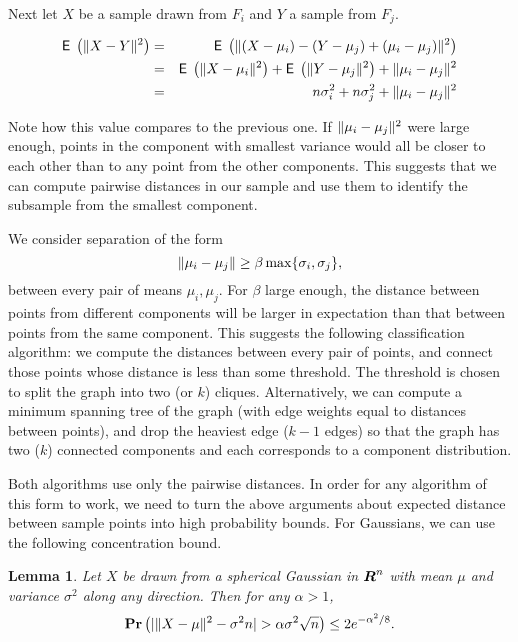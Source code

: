 \documentclass{book}
\newtheorem{lemma}[theorem]{Lemma}
\numberwithin{exercise}{chapter}
\begin{document}
Next let $X$ be a sample drawn from $F_i$ and $Y$ a sample from $F_j$.

\begin{eqnarray*}
\hbox{{\sf E}\;}\left(\|X-Y\|^2\right)  &=& \hbox{{\sf E}\;}\left(\|(X-\mu_i) - (Y-\mu_j) + (\mu_i-\mu_j)\|^2\right) \\
&=& \hbox{{\sf E}\;}\left(\|X-\mu_i\|^2\right) + \hbox{{\sf E}\;}\left(\|Y-\mu_j\|^2\right) + \|\mu_i-\mu_j\|^2 \\
&=&  n\sigma_i^2 + n\sigma_j^2 + \|\mu_i-\mu_j\|^2 \\
\end{eqnarray*}

Note how this value compares to the previous one.
If $\|\mu_i-\mu_j\|^2$ were large enough, points in the component with smallest variance would all be closer to each other than to any point from the other components. This suggests that we can compute pairwise distances in our sample and use them to identify the subsample from the smallest component.

We consider separation of the form
\begin{equation}\label{geom-sep}
\|\mu_i-\mu_j\| \ge \beta \max\{\sigma_i, \sigma_j\},
\end{equation}
between every pair of means $\mu_i, \mu_j$.
For $\beta$ large enough, the distance between points from different
components
will be larger in expectation than that between points from the same component.
This suggests the following classification algorithm: we
compute the distances between every pair of points, and
connect those points whose distance is less than some threshold.  The
threshold is chosen to split the graph into two (or $k$) cliques.
Alternatively, we can compute a minimum spanning tree of
the graph (with edge weights equal to distances between points), and
drop the heaviest edge ($k-1$ edges) so that the graph has two ($k$) connected components and each corresponds to a component distribution.

Both algorithms use only the pairwise distances.
In order for any algorithm of this form to work, we need to turn the
above arguments about expected distance between sample points into high probability
bounds. For Gaussians, we can use the following concentration bound.

\begin{lemma}\label{lem:spherical-conc}
Let $X$ be drawn from a spherical Gaussian in $\mbox{\mbox{\boldmath $R$}}^n$ with mean $\mu$ and variance $\sigma^2$ along any direction. Then for any $\alpha > 1$,
$$\mbox{{\bf Pr}}\left(|\|X-\mu\|^2 -\sigma^2n | > \alpha\sigma^2\sqrt{n}\right) \le
2e^{-\alpha^2/8}.$$
\end{lemma}
\end{document}
